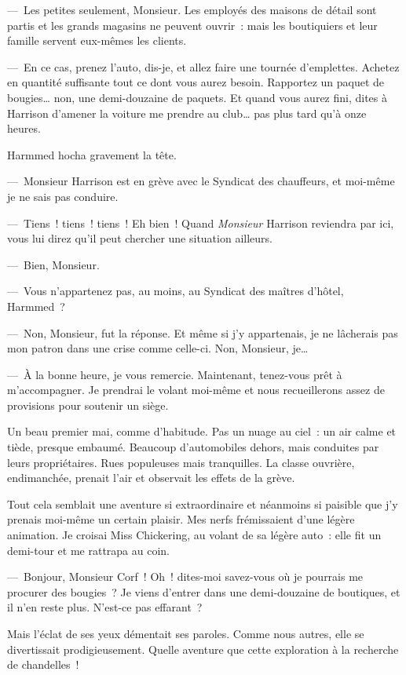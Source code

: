 \documentclass[french,twoside]{book} %
\begin{document}
— Les petites seulement, Monsieur. Les employés des maisons de détail sont partis et les grands magasins ne peuvent ouvrir : mais les boutiquiers et leur famille servent eux-mêmes les clients.\par
— En ce cas, prenez l’auto, dis-je, et allez faire une tournée d’emplettes. Achetez en quantité suffisante tout ce dont vous aurez besoin. Rapportez un paquet de bougies… non, une demi-douzaine de paquets. Et quand vous aurez fini, dites à Harrison d’amener la voiture me prendre au club… pas plus tard qu’à onze heures.\par
Harmmed hocha gravement la tête.\par
— Monsieur Harrison est en grève avec le Syndicat des chauffeurs, et moi-même je ne sais pas conduire.\par
— Tiens ! tiens ! tiens ! Eh bien ! Quand \emph{Monsieur} Harrison reviendra par ici, vous lui direz qu’il peut chercher une situation ailleurs.\par
— Bien, Monsieur.\par
— Vous n’appartenez pas, au moins, au Syndicat des maîtres d’hôtel, Harmmed ?\par
— Non, Monsieur, fut la réponse. Et même si j’y appartenais, je ne lâcherais pas mon patron dans une crise comme celle-ci. Non, Monsieur, je…\par
— À la bonne heure, je vous remercie. Maintenant, tenez-vous prêt à m’accompagner. Je prendrai le volant moi-même et nous recueillerons assez de provisions pour soutenir un siège.\par
Un beau premier mai, comme d’habitude. Pas un nuage au ciel : un air calme et tiède, presque embaumé. Beaucoup d’automobiles dehors, mais conduites par leurs propriétaires. Rues populeuses mais tranquilles. La classe ouvrière, endimanchée, prenait l’air et observait les effets de la grève.\par
Tout cela semblait une aventure si extraordinaire et néanmoins si paisible que j’y prenais moi-même un certain plaisir. Mes nerfs frémissaient d’une légère animation. Je croisai Miss Chickering, au volant de sa légère auto : elle fit un demi-tour et me rattrapa au coin.\par
— Bonjour, Monsieur Corf ! Oh ! dites-moi savez-vous où je pourrais me procurer des bougies ? Je viens d’entrer dans une demi-douzaine de boutiques, et il n’en reste plus. N’est-ce pas effarant ?\par
Mais l’éclat de ses yeux démentait ses paroles. Comme nous autres, elle se divertissait prodigieusement. Quelle aventure que cette exploration à la recherche de chandelles !\par
\end{document}
